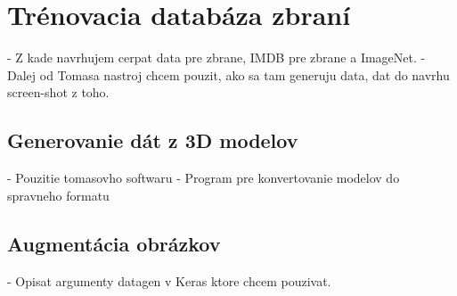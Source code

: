 
\section{Trénovacia databáza zbraní}
- Z kade navrhujem cerpat data pre zbrane, IMDB pre zbrane a ImageNet.
- Dalej od Tomasa nastroj chcem pouzit, ako sa tam generuju data, dat do navrhu screen-shot z toho.

\subsection{Generovanie dát z 3D modelov}
- Pouzitie tomasovho softwaru
- Program pre konvertovanie modelov do spravneho formatu

\subsection{Augmentácia obrázkov}
- Opisat argumenty datagen v Keras ktore chcem pouzivat.
